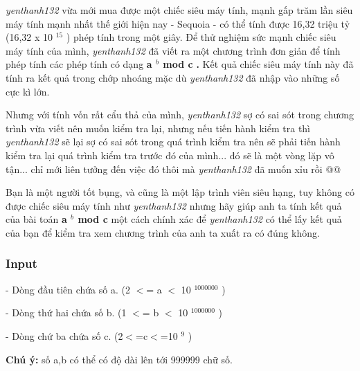 



\emph{      yenthanh132     }     vừa mới mua được một chiếc siêu máy tính, mạnh gấp trăm lần siêu máy tính mạnh nhất thế giới hiện nay - Sequoia - có thể tính được 16,32 triệu tỷ (16,32 x 10    $^      15     $     ) phép tính trong một giây. Để thử nghiệm sức mạnh chiếc siêu máy tính của mình,    \emph{      yenthanh132     }     đã viết ra một chương trình đơn giản để tính phép tính các phép tính có dạng    \textbf{      a     $^       b      $      mod c     }\textbf{      .     }\textbf{}     Kết quả chiếc siêu máy tính này đã tính ra kết quả trong chớp nhoáng mặc dù    \emph{      yenthanh132     }     đã nhập vào những số cực kì lớn.    



     Nhưng với tính vốn rất cẩu thả của mình,    \emph{      yenthanh132     }     sợ có sai sót trong chương trình vừa viết nên muốn kiểm tra lại, nhưng nếu tiến hành kiểm tra thì    \emph{      yenthanh132     }     sẽ lại sợ có sai sót trong quá trình kiểm tra nên sẽ phải tiến hành kiểm tra lại quá trình kiểm tra trước đó của mình... đó sẽ là một vòng lặp vô tận... chỉ mới liên tưởng đến việc đó thôi mà    \emph{      yenthanh132     }     đã muốn xỉu rồi @@    



     Bạn là một người tốt bụng, và cũng là một lập trình viên siêu hạng, tuy không có được chiếc siêu máy tính như    \emph{      yenthanh132     }     nhưng hãy giúp anh ta tính kết quả của bài toán    \textbf{      a     $^       b      $      mod c     }     một cách chính xác để    \emph{      yenthanh132     }     có thể lấy kết quả của bạn để kiểm tra xem chương trình của anh ta xuất ra có đúng không.    

\subsubsection{   Input  }

    - Dòng đầu tiên chứa số a. (2 $<$= a $<$ 10   $^     1000000    $    )   



    - Dòng thứ hai chứa số b. (1 $<$= b $<$ 10   $^     1000000    $    )   



    - Dòng chứ ba chứa số c. (2$<$=c$<$=10   $^     9    $    )   



\textbf{     Chú ý:    }    số a,b có thể có độ dài lên tới 999999 chữ số.   

